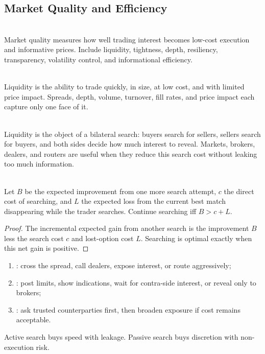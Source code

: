 \subsection{Market Quality and Efficiency}

\begin{definition} \\
Market quality measures how well trading interest becomes low-cost execution and informative prices. Include liquidity, tightness, depth, resiliency, transparency, volatility control, and informational efficiency.
\end{definition}

\begin{definition} \\
Liquidity is the ability to trade quickly, in size, at low cost, and with limited price impact. Spreads, depth, volume, turnover, fill rates, and price impact each capture only one face of it.
\end{definition}

\begin{mechanism} \\
Liquidity is the object of a bilateral search: buyers search for sellers, sellers search for buyers, and both sides decide how much interest to reveal. Markets, brokers, dealers, and routers are useful when they reduce this search cost without leaking too much information.
\end{mechanism}

\begin{proposition} \\
Let $B$ be the expected improvement from one more search attempt, $c$ the direct cost of searching, and $L$ the expected loss from the current best match disappearing while the trader searches. Continue searching iff $B>c+L$.
\begin{proof}
The incremental expected gain from another search is the improvement $B$ less the search cost $c$ and lost-option cost $L$. Searching is optimal exactly when this net gain is positive.
\end{proof}
\end{proposition}

\begin{taxonomy} 
\begin{enumerate}[label=\roman*.]
\setlength{\itemsep}{0pt}
\item {}: cross the spread, call dealers, expose interest, or route aggressively;
\item {}: post limits, show indications, wait for contra-side interest, or reveal only to brokers;
\item {}: ask trusted counterparties first, then broaden exposure if cost remains acceptable.
\end{enumerate}
Active search buys speed with leakage. Passive search buys discretion with non-execution risk.
\end{taxonomy}

